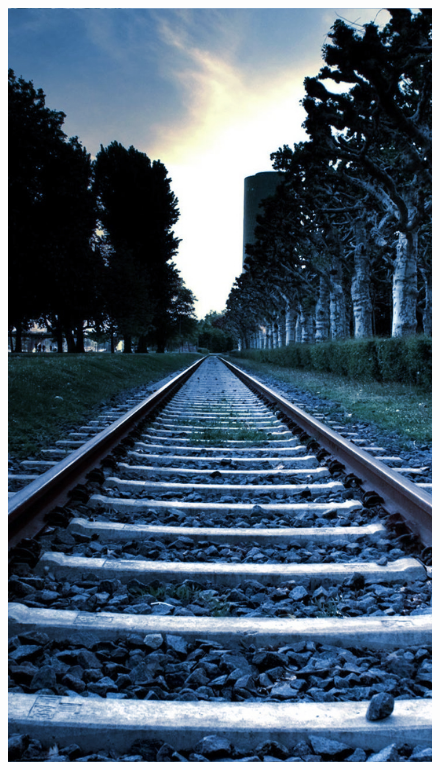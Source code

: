 \begin{figure}[ht]
\begin{minipage}{.24\textwidth}
        \includegraphics[width=.9\textwidth]{imgs/vias-pasado.jpg}
    \end{minipage}
    \begin{minipage}{.24\textwidth}

\end{minipage}
\end{figure}

